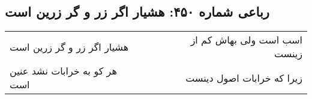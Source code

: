 \begin{center}
\section*{رباعی شماره ۴۵۰: هشیار اگر زر و گر زرین است}
\label{sec:0450}
\begin{longtable}{l p{0.5cm} r}
هشیار اگر زر و گر زرین است
&&
اسب است ولی بهاش کم از زینست
\\
هر کو به خرابات نشد عنین است
&&
زیرا که خرابات اصول دینست
\\
\end{longtable}
\end{center}

